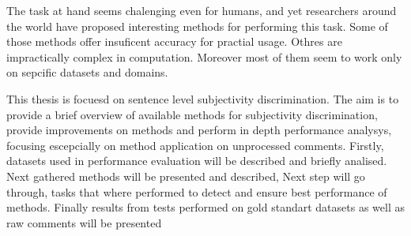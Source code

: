 The task at hand seems chalenging even for humans, and yet researchers around the world have proposed interesting methods
for performing this task. Some of those methods offer insuficent accuracy for practial usage. Othres are impractically complex
in computation. Moreover most of them seem to work only on sepcific datasets and domains. 

This thesis is focuesd on sentence level subjectivity discrimination. The aim is to provide a brief overview of available methods
for subjectivity discrimination, provide improvements on  methods and perform in depth performance analysys, focusing escepcially on method application on unprocessed comments. 
Firstly, datasets used in performance evaluation will be described and briefly analised. Next gathered methods will be presented and described, 
Next step will go through, tasks that where performed to detect and ensure best performance of methods. Finally results from tests performed on gold 
standart datasets as well as raw comments will be presented